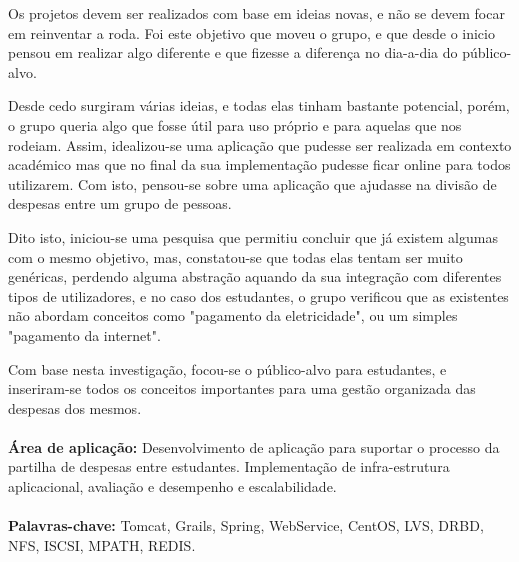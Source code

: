 \begin{resumo}

Os projetos devem ser realizados com base em ideias novas, e não se devem focar em reinventar a roda. Foi este objetivo que moveu o grupo, e que desde o inicio pensou em realizar algo diferente e que fizesse a diferença no dia-a-dia do público-alvo.

Desde cedo surgiram várias ideias, e todas elas tinham bastante potencial, porém, o grupo queria algo que fosse útil para uso próprio e para aquelas que nos rodeiam. Assim, idealizou-se uma aplicação que pudesse ser realizada em contexto académico mas que no final da sua implementação pudesse ficar online para todos utilizarem. Com isto, pensou-se sobre uma aplicação que ajudasse na divisão de despesas entre um grupo de pessoas.

Dito isto, iniciou-se uma pesquisa que permitiu concluir que já existem algumas com o mesmo objetivo, mas, constatou-se que todas elas tentam ser muito genéricas, perdendo alguma abstração aquando da sua integração com diferentes tipos de utilizadores, e no caso dos estudantes, o grupo verificou que as existentes não abordam conceitos como "pagamento da eletricidade", ou um simples "pagamento da internet".

Com base nesta investigação, focou-se o público-alvo para estudantes, e inseriram-se todos os conceitos importantes para uma gestão organizada das despesas dos mesmos. \\\\

\textbf{Área de aplicação:} Desenvolvimento de aplicação para suportar o processo da partilha de despesas entre estudantes. Implementação de infra-estrutura aplicacional, avaliação e desempenho e escalabilidade. \\\\

\textbf{Palavras-chave:} Tomcat, Grails, Spring, WebService, CentOS, LVS, DRBD, NFS, ISCSI, MPATH, REDIS.

\end{resumo}